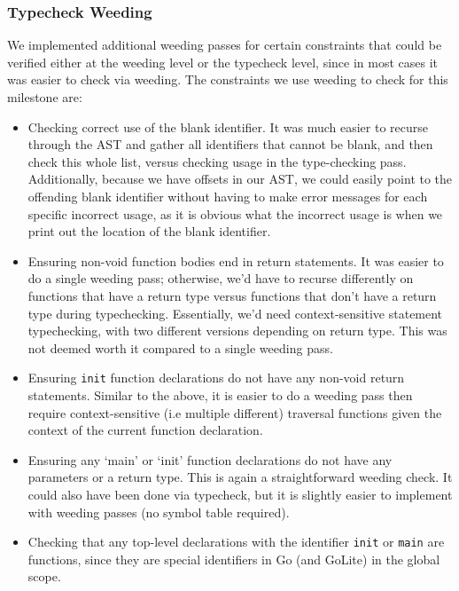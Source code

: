 \documentclass[11pt]{article}
\begin{document}
\subsubsection{Typecheck Weeding}
We implemented additional weeding passes for certain constraints that
could be verified either at the weeding level or the typecheck level,
since in most cases it was easier to check via weeding. The
constraints we use weeding to check for this milestone are:
\begin{itemize}
\item Checking correct use of the blank identifier. It was much easier
  to recurse through the AST and gather all identifiers that cannot be
  blank, and then check this whole list, versus checking usage in the
  type-checking pass. Additionally, because we have offsets in our
  AST, we could easily point to the offending blank identifier without
  having to make error messages for each specific incorrect usage, as
  it is obvious what the incorrect usage is when we print out the
  location of the blank identifier.
\item Ensuring non-void function bodies end in return statements. It
  was easier to do a single weeding pass; otherwise, we'd have to
  recurse differently on functions that have a return type versus
  functions that don't have a return type during
  typechecking. Essentially, we'd need context-sensitive statement
  typechecking, with two different versions depending on return
  type. This was not deemed worth it compared to a single weeding
  pass.
\item Ensuring \texttt{init} function declarations do not have any
  non-void return statements. Similar to the above, it is easier to do
  a weeding pass then require context-sensitive (i.e multiple
  different) traversal functions given the context of the current
  function declaration.
\item Ensuring any `main' or `init' function declarations do not have
  any parameters or a return type. This is again a straightforward
  weeding check.  It could also have been done via typecheck, but it
  is slightly easier to implement with weeding passes (no symbol table
  required).
\item Checking that any top-level declarations with the identifier
  \texttt{init} or \texttt{main} are functions, since they are special
  identifiers in Go (and GoLite) in the global scope.
\end{itemize}
\end{document}
